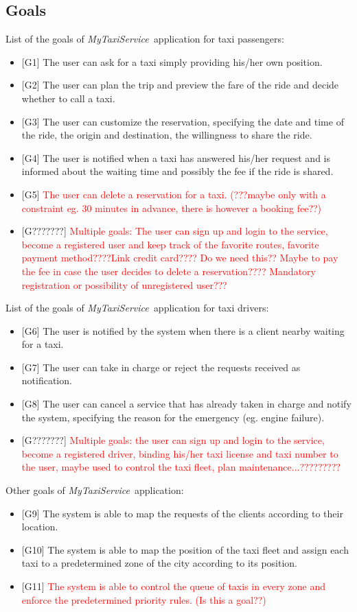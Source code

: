 \documentclass[a4paper,11pt]{report} %
\newcommand{\mts}{\mbox{\normalfont\itshape MyTaxiService\ }}
\begin{document}
	\subsection{Goals} \label{sec:goals}
	List of the goals of \mts application for taxi passengers:
		\begin{itemize}
			\item {[}G1{]} The user can ask for a taxi simply providing his/her own position.
			\item {[}G2{]} The user can plan the trip and preview the fare of the ride and decide whether to call a taxi.
			\item {[}G3{]} The user can customize the reservation, specifying the date and time of the ride, the origin and destination, the willingness to share the ride.
			\item {[}G4{]} The user is notified when a taxi has answered his/her request and is informed about the waiting time and possibly the fee if the ride is shared.
			\item {[}G5{]} \textcolor{red}{The user can delete a reservation for a taxi. (???maybe only with a constraint eg. 30 minutes in advance, there is however a booking fee??)}
			\item {[}G???????{]} \textcolor{red}{Multiple goals: The user can sign up and login to the service, become a registered user and keep track of the favorite routes, favorite payment method????Link credit card???? Do we need this?? Maybe to pay the fee in case the user decides to delete a reservation???? Mandatory registration or possibility of unregistered user???}
		\end{itemize}
		List of the goals of \mts application for taxi drivers:
		\begin{itemize}
			\item {[}G6{]} The user is notified by the system when there is a client nearby waiting for a taxi.
			\item {[}G7{]} The user can take in charge or reject the requests received as notification.
			\item {[}G8{]} The user can cancel a service that has already taken in charge and notify the system, specifying the reason for the emergency (eg. engine failure).
			\item {[}G???????{]} \textcolor{red}{Multiple goals: the user can sign up and login to the service, become a registered driver, binding his/her taxi license and taxi number to the user, maybe used to control the taxi fleet, plan maintenance...?????????}
		\end{itemize}
		Other goals of \mts application:
		\begin{itemize}
			\item {[}G9{]} The system is able to map the requests of the clients according to their location.
			\item {[}G10{]} The system is able to map the position of the taxi fleet and assign each taxi to a predetermined zone of the city according to its position.
			\item {[}G11{]} \textcolor{red}{The system is able to control the queue of taxis in every zone and enforce the predetermined priority rules. (Is this a goal??)}
		\end{itemize}
		
\end{document}
